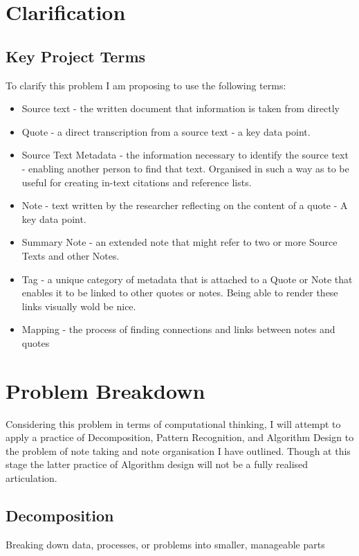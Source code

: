 \documentclass{article}
\begin{document}
\section{Clarification}
\subsection{Key Project Terms}

To clarify this problem I am proposing to use the following terms:
\begin{itemize}
    \item Source text - the written document that information is taken from directly
    \item Quote - a direct transcription from a source text - a key data point.
    \item Source Text Metadata - the information necessary to identify the source text - enabling another person to find that text. Organised in such a way as to be useful for creating in-text citations and reference lists.
    \item Note - text written by the researcher reflecting on the content of a quote - A key data point.
    \item Summary Note - an extended note that might refer to two or more Source Texts and other Notes. 
    \item Tag - a unique category of metadata that is attached to a Quote or Note that enables it to be linked to other quotes or notes. Being able to render these links visually wold be nice. 
    \item Mapping - the process of finding connections and links between notes and quotes
\end{itemize}

\section{Problem Breakdown}
Considering this problem in terms of computational thinking, I will attempt to apply a practice of Decomposition, Pattern Recognition, and Algorithm Design to the problem of note taking and note organisation I have outlined. Though at this stage the latter practice of Algorithm design will not be a fully realised articulation.

\subsection{Decomposition}
Breaking down data, processes, or problems into smaller, manageable parts
\end{document}
